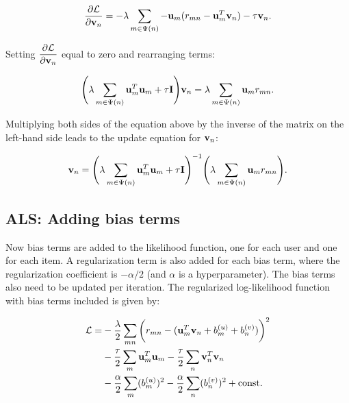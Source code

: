\documentclass{article}
\begin{document}
\[
    \dfrac{\partial \mathcal{L}}{\partial \vb{v}_{n}} = -\lambda \sum\limits_{m \in \Psi(n)} -\vb{u}_{m}(r_{mn} - \vb{u}_{m}^{T} \vb{v}_{n}) - \tau \vb{v}_{n}\text{.}
\]

Setting $\dfrac{\partial \mathcal{L}}{\partial \vb{v}_n}$ equal to zero and rearranging terms:

\[
    \Bigg(\lambda \sum\limits_{m \in \Psi(n)} \vb{u}_{m}^{T}\vb{u}_{m} + \tau \vb{I} \Bigg)\vb{v}_n
    = \lambda \sum\limits_{m \in \Psi(n)} \vb{u}_{m} r_{mn}\text{.}
\]

Multiplying both sides of the equation above by the inverse of the matrix on the left-hand side leads to the update equation for $\vb{v}_n$:

\begin{equation} \label{v_1}
    \begin{split}
        \vb{v}_n = \Bigg(\lambda \sum\limits_{m \in \Psi(n)} \vb{u}_{m}^{T}\vb{u}_{m} + \tau \vb{I} \Bigg)^{-1}
        \Bigg(\lambda \sum\limits_{m \in \Psi(n)} \vb{u}_{m} r_{mn}\Bigg)\text{.}
    \end{split}
\end{equation}


\subsection{ALS: Adding bias terms} \label{als_bias}
Now bias terms are added to the likelihood function, one for each user and one for each item.
A regularization term is also added for each bias term, where the regularization coefficient is $-\alpha/2$ 
(and $\alpha$ is a hyperparameter).
The bias terms also need to be updated per iteration.
The regularized log-likelihood function with bias terms included is given by:

\begin{equation} \label{ll2}
    \begin{split}
    \mathcal{L} = & -\dfrac{\lambda}{2} \sum\limits_{mn} \bigg(r_{mn} - (\vb{u}_{m}^{T} \vb{v}_{n} + b_{m}^{(u)} + b_{n}^{(v)})\bigg)^{2} \\
                  & -\dfrac{\tau}{2} \sum\limits_{m} \vb{u}_{m}^{T} \vb{u}_{m} - \dfrac{\tau}{2} \sum\limits_{n} \vb{v}_{n}^{T} \vb{v}_{n} \\
                  & -\dfrac{\alpha}{2} \sum\limits_{m} (b_{m}^{(u)})^{2} - \dfrac{\alpha}{2} \sum\limits_{n} (b_{n}^{(v)})^{2} + \text{const}\text{.}
    \end{split}
\end{equation}
\end{document}
